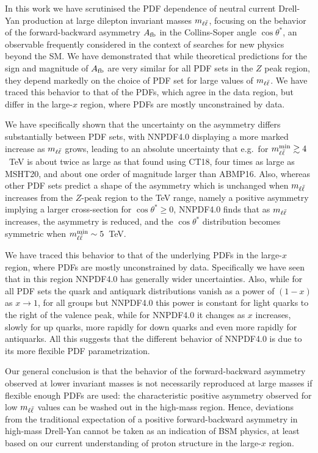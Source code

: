 
In this work we have scrutinised the PDF dependence of  neutral current
Drell-Yan production
at large dilepton invariant masses $m_{\ell\bar{\ell}}$, focusing on the behavior
of the forward-backward asymmetry $A_{\rm fb}$
in the Collins-Soper angle $\cos\theta^*$, an observable frequently
considered in the context of searches for new physics beyond the SM.
%
We have demonstrated that while theoretical
predictions for the sign and magnitude of $A_{\rm fb}$ are very
similar for all PDF sets in the
$Z$ peak region, they
depend markedly on the choice of PDF set for  large values of $m_{\ell\bar{\ell}}$. 
We have traced this behavior to that of the PDFs, which agree in the
data region, but differ in the large-$x$
region, where PDFs are mostly unconstrained by data.

We have specifically shown that the uncertainty on the asymmetry
differs substantially between PDF sets, with NNPDF4.0 displaying
a more marked increase as  $m_{\ell\bar{\ell}}$ grows, leading to
an absolute uncertainty that e.g.\ for $m_{\ell\bar{\ell}}^{\rm min}\gtrsim4$~TeV
is about twice as large as that found using CT18, 
four times as large as MSHT20,
and about one order of magnitude larger than ABMP16.
%
Also, whereas other PDF sets predict a shape of the asymmetry
which is unchanged when  $m_{\ell\bar{\ell}}$ increases from the $Z$-peak region to
the TeV range, namely a 
positive
asymmetry implying a larger cross-section  for $\cos\theta^*\ge 0$, NNPDF4.0 finds that as
$m_{\ell\bar{\ell}}$ increases, the asymmetry is reduced, and the $\cos\theta^*$ distribution
becomes symmetric when $m_{\ell\bar{\ell}}^{\rm min}\sim5$~TeV.

We have traced this behavior to that of the underlying
PDFs in the large-$x$ region, where PDFs are mostly unconstrained by
data.
%
Specifically we have seen that in this region NNPDF4.0 has
generally wider uncertainties.
%
Also, while for  all PDF  sets the
quark and antiquark distributions vanish as
a power of $(1-x)$ as $x\to 1$, for all groups but NNPDF4.0 this power is
constant for light quarks to the right of the valence peak, while for
NNPDF4.0 it changes as $x$ increases, slowly for up quarks, more rapidly
for down quarks and even more rapidly for antiquarks.
%
All this suggests that the different behavior of
NNPDF4.0 is due to its more flexible PDF parametrization.

Our general conclusion is that the 
behavior of the forward-backward asymmetry
observed at lower invariant masses is not necessarily reproduced at
large masses if flexible enough
PDFs are used:  the characteristic positive asymmetry observed
for low $m_{\ell\bar{\ell}}$ values
can be washed out in the high-mass region.
%
Hence, deviations from the traditional expectation of a positive forward-backward
asymmetry in high-mass Drell-Yan cannot be taken as an indication of 
BSM physics,
at least based on  our current understanding of proton structure in the large-$x$ region.

